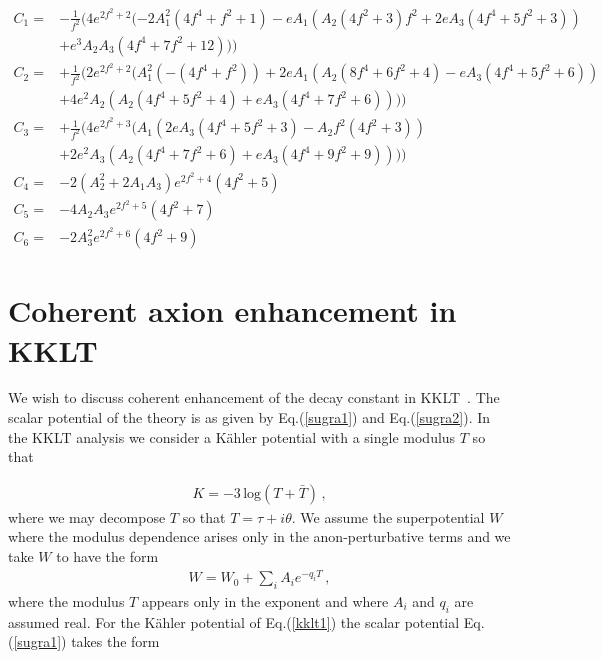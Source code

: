 \documentclass[12pt]{article}
\begin{document}
\begin{align}
  C_1 = & - \frac{1}{f^2} (4 {e}^{2 {f}^{2} + 2} ( - 2 {A}_{1}^{2} \left( 4 {f}^{4} + {f}^{2} + 1 \right) - e {A}_{1} \left( {A}_{2} \left( 4 {f}^{2} + 3 \right)  {f}^{2} + 2 e {A}_{3} \left( 4 {f}^{4} + 5 {f}^{2} + 3 \right) \right) \nonumber\\
        & + {e}^{3} {A}_{2} {A}_{3} \left( 4 {f}^{4} + 7 {f}^{2} + 12 \right) ))\nonumber\\
  C_2= & + \frac{1}{f^2}(2 {e}^{2 {f}^{2} + 2} ( {A}_{1}^{2} \left( - \left( 4 {f}^{4} + {f}^{2} \right) \right) + 2 e {A}_{1} \left( {A}_{2} \left( 8 {f}^{4} + 6 {f}^{2} + 4 \right) - e {A}_{3} \left( 4 {f}^{4} + 5 {f}^{2} + 6 \right) \right) \nonumber\\
        & + 4 {e}^{2} {A}_{2} \left( {A}_{2} \left( 4 {f}^{4} + 5 {f}^{2} + 4 \right) + e {A}_{3} \left( 4 {f}^{4} + 7 {f}^{2} + 6 \right) \right) ))\nonumber\\
  C_3= & + \frac{1}{f^2}(4 {e}^{2 {f}^{2} + 3} ( {A}_{1} \left( 2 e {A}_{3} \left( 4 {f}^{4} + 5 {f}^{2} + 3 \right) - {A}_{2} {f}^{2} \left( 4 {f}^{2} + 3 \right) \right) \nonumber\\
        & + 2 {e}^{2} {A}_{3} \left( {A}_{2} \left( 4 {f}^{4} + 7 {f}^{2} + 6 \right) + e {A}_{3} \left( 4 {f}^{4} + 9 {f}^{2} + 9 \right) \right) ))\nonumber\\
  C_4= & - 2 \left( {A}_{2}^{2} + 2 {A}_{1} {A}_{3} \right)  {e}^{2 {f}^{2} + 4} \left( 4 {f}^{2} + 5 \right) \nonumber\\
  C_5= & - 4 {A}_{2} {A}_{3} {e}^{2 {f}^{2} + 5} \left( 4 {f}^{2} + 7 \right) \nonumber\\
  C_6= & - 2 {A}_{3}^{2} {e}^{2 {f}^{2} + 6} \left( 4 {f}^{2} + 9 \right)
  \label{c1}
\end{align}


\section{Coherent axion enhancement in KKLT\label{sec:KKLT}}
We wish to discuss coherent enhancement of the decay constant in KKLT~\cite{Kachru:2003aw}.
The scalar potential of the theory is as given by Eq.(\ref{sugra1}) and Eq.(\ref{sugra2}).
In the KKLT analysis we consider a K\"ahler potential with a single modulus $T$ so that

\begin{align}
  K = -3 \, \text{log}(T+ \bar T)\,,
  \label{kklt1}
\end{align}
where we may decompose $T$ so that
$T= \tau + i \theta$.
We assume the superpotential $W$ where the modulus dependence arises only in the anon-perturbative terms
and we take $W$ to have the form
\begin{align}
  W= W_0 +\sum_{i} A_i e^{- q_iT}\,,
  \label{w0A}
\end{align}
where the modulus $T$ appears only in the exponent and where $A_i$ and $q_i$ are assumed real.
For the K\"ahler potential of Eq.(\ref{kklt1}) the scalar potential Eq. (\ref{sugra1}) takes the form
\end{document}
